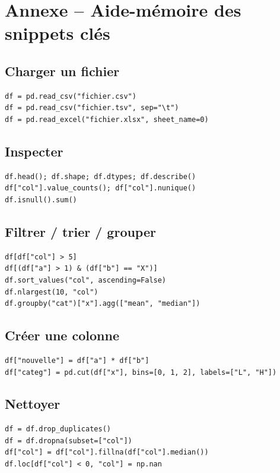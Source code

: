 \documentclass[11pt,a4paper]{article}
\begin{document}
\section*{Annexe -- Aide-m\'emoire des snippets cl\'es}

\subsection*{Charger un fichier}
\begin{verbatim}
df = pd.read_csv("fichier.csv")
df = pd.read_csv("fichier.tsv", sep="\t")
df = pd.read_excel("fichier.xlsx", sheet_name=0)
\end{verbatim}

\subsection*{Inspecter}
\begin{verbatim}
df.head(); df.shape; df.dtypes; df.describe()
df["col"].value_counts(); df["col"].nunique()
df.isnull().sum()
\end{verbatim}

\subsection*{Filtrer / trier / grouper}
\begin{verbatim}
df[df["col"] > 5]
df[(df["a"] > 1) & (df["b"] == "X")]
df.sort_values("col", ascending=False)
df.nlargest(10, "col")
df.groupby("cat")["x"].agg(["mean", "median"])
\end{verbatim}

\subsection*{Cr\'eer une colonne}
\begin{verbatim}
df["nouvelle"] = df["a"] * df["b"]
df["categ"] = pd.cut(df["x"], bins=[0, 1, 2], labels=["L", "H"])
\end{verbatim}

\subsection*{Nettoyer}
\begin{verbatim}
df = df.drop_duplicates()
df = df.dropna(subset=["col"])
df["col"] = df["col"].fillna(df["col"].median())
df.loc[df["col"] < 0, "col"] = np.nan
\end{verbatim}
\end{document}
